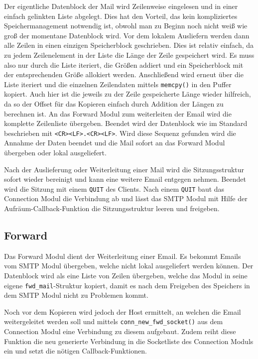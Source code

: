 \documentclass[final,a4paper,11pt,notitlepage,halfparskip]{scrreprt}
\begin{document}
Der eigentliche Datenblock der Mail wird Zeilenweise eingelesen und in einer
einfach gelinkten Liste abgelegt. Dies hat den Vorteil, das kein kompliziertes
Speichermanagement notwendig ist, obwohl man zu Beginn noch nicht weiß wie groß
der momentane Datenblock wird. Vor dem lokalem Ausliefern werden dann alle 
Zeilen in einen einzigen Speicherblock geschrieben. Dies ist relativ einfach, 
da zu jedem Zeilenelement in der Liste die Länge der Zeile gespeichert wird. 
Es muss also nur durch die Liste iteriert, die Größen addiert und ein 
Speicherblock mit der entsprechenden Größe allokiert werden. 
Anschließend wird erneut über die Liste iteriert und die einzelnen Zeilendaten 
mittels \texttt{memcpy()} in den Puffer kopiert. Auch hier ist die jeweils zu der 
Zeile gespeicherte Länge wieder hilfreich, da so der Offset für das Kopieren 
einfach durch Addition der Längen zu berechnen ist. 
An das Forward Modul zum weiterleiten der Email wird die komplette Zeilenliste
übergeben.
Beendet wird der Datenblock wie im Standard beschrieben mit
\texttt{<CR><LF>.<CR><LF>}. Wird diese Sequenz gefunden wird die Annahme der
Daten beendet und die Mail sofort an das Forward Modul übergeben oder lokal
ausgeliefert.

Nach der Auslieferung oder Weiterleitung einer Mail wird die Sitzungsstruktur
sofort wieder bereinigt und kann eine weitere Email entgegen nehmen. Beendet
wird die Sitzung mit einem \texttt{QUIT} des Clients. Nach einem \texttt{QUIT} 
baut das Connection Modul die Verbindung ab und lässt das SMTP Modul mit Hilfe 
der Aufräum-Callback-Funktion die Sitzungsstruktur leeren und freigeben.


\subsection{Forward}
Das Forward Modul dient der Weiterleitung einer Email. Es bekommt Emails vom
SMTP Modul übergeben, welche nicht lokal ausgeliefert werden können. Der
Datenblock wird als eine Liste von Zeilen übergeben, welche das Modul in seine
eigene \texttt{fwd\_mail}-Struktur kopiert, damit es nach dem Freigeben des
Speichers in dem SMTP Modul nicht zu Problemen kommt.

Noch vor dem Kopieren wird jedoch der Host ermittelt, an welchen die Email
weitergeleitet werden soll und mittels \texttt{conn\_new\_fwd\_socket()} aus dem
Connection Modul eine Verbindung zu diesem aufgebaut. Zudem reiht diese Funktion
die neu generierte Verbindung in die Socketliste des Connection Moduls ein und
setzt die nötigen Callback-Funktionen.
\end{document}
